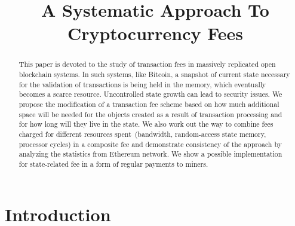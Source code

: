 \documentclass[]{llncs}   %
\begin{document}
\title{A Systematic Approach To Cryptocurrency Fees}


\maketitle

\begin{abstract}

This paper is devoted to the study of transaction fees in massively replicated
open blockchain systems. In such systems, like Bitcoin, a snapshot of current
state necessary for the validation of transactions is being held in the memory,
which eventually becomes a scarce resource.  Uncontrolled state growth can lead
to security issues.  We propose the modification of a transaction fee scheme
based on how much additional space will be needed for the objects created as a
result of transaction processing and for how long will they live in the state.
We also work out the way to combine fees charged for different resources
spent~(bandwidth, random-access state memory, processor cycles) in a composite
fee and demonstrate consistency of the approach by analyzing the statistics from
Ethereum network. We show a possible implementation for state-related fee in a
form of regular payments to miners.

\end{abstract}

\section{Introduction}
\end{document}
